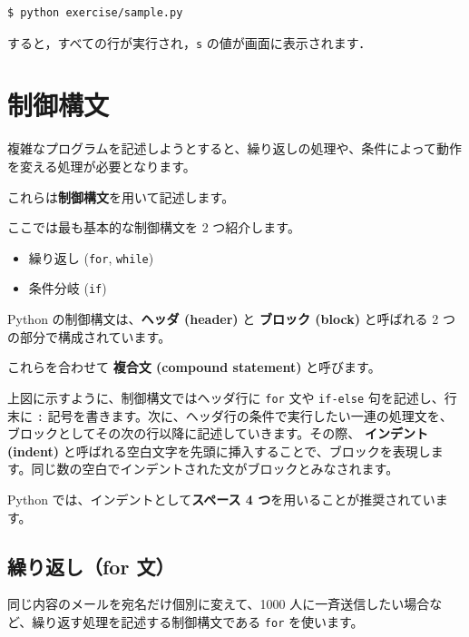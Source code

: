 \begin{lstlisting}[style=codecell]
$ python exercise/sample.py
\end{lstlisting}

すると，すべての行が実行され，\texttt{s} の値が画面に表示されます．


\section{制御構文}


複雑なプログラムを記述しようとすると、繰り返しの処理や、条件によって動作を変える処理が必要となります。

これらは\textbf{制御構文}を用いて記述します。


ここでは最も基本的な制御構文を 2 つ紹介します。


\begin{itemize}
\item 繰り返し (\texttt{for}, \texttt{while})
\item 条件分岐 (\texttt{if})
\end{itemize}


Python の制御構文は、\textbf{ヘッダ (header)} と \textbf{ブロック (block)} と呼ばれる 2 つの部分で構成されています。

これらを合わせて \textbf{複合文 (compound statement)} と呼びます。




上図に示すように、制御構文ではヘッダ行に \texttt{for} 文や \texttt{if-else} 句を記述し、行末に \texttt{:} 記号を書きます。次に、ヘッダ行の条件で実行したい一連の処理文を、ブロックとしてその次の行以降に記述していきます。その際、 \textbf{インデント (indent)} と呼ばれる空白文字を先頭に挿入することで、ブロックを表現します。同じ数の空白でインデントされた文がブロックとみなされます。

Python では、インデントとして\textbf{スペース 4 つ}を用いることが推奨されています。


\subsection{繰り返し（for 文）}


同じ内容のメールを宛名だけ個別に変えて、1000 人に一斉送信したい場合など、繰り返す処理を記述する制御構文である \texttt{for} を使います。




